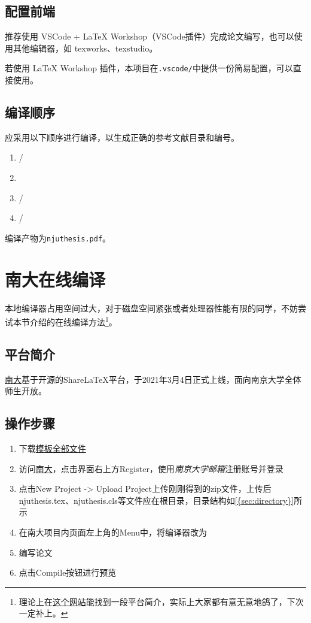 \subsection{配置前端}

推荐使用 VSCode + LaTeX Workshop（VSCode插件）完成论文编写，也可以使用其他编辑器，如 texworks、texstudio。

若使用 LaTeX Workshop 插件，本项目在\lstinline|.vscode/|中提供一份简易配置，可以直接使用。

\subsection{编译顺序}
应采用以下顺序进行编译，以生成正确的参考文献目录和编号。
\begin{enumerate}
    \item {}/
    \item {}
    \item {}/
    \item {}/
\end{enumerate}

编译产物为\lstinline|njuthesis.pdf|。

\section{南大在线编译}

本地编译器占用空间过大，对于磁盘空间紧张或者处理器性能有限的同学，不妨尝试本节介绍的在线编译方法\footnote{理论上在\href{https://doc.nju.edu.cn/books/latex}{这个网站}能找到一段平台简介，实际上大家都有意无意地鸽了，下次一定补上。}。

\subsection{平台简介}

\href{https://tex.nju.edu.cn}{南大}基于开源的ShareLaTeX平台，于2021年3月4日正式上线，面向南京大学全体师生开放。

\subsection{操作步骤}

\begin{enumerate}
    \item 下载\href{https://github.com/nju-lug/NJUThesisUndergraduate/archive/refs/heads/master.zip}{模板全部文件}
    \item 访问\href{https://tex.nju.edu.cn}{南大}，点击界面右上方Register，使用\emph{南京大学邮箱}注册账号并登录
    \item 点击New Project -> Upload Project上传刚刚得到的zip文件，上传后njuthesis.tex、njuthesis.cls等文件应在根目录，目录结构如\cref{{sec:directory}}所示
    \item 在南大项目内页面左上角的Menu中，将编译器改为
    \item 编写论文
    \item 点击Compile按钮进行预览
\end{enumerate}

